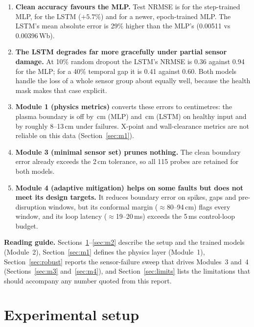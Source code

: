 \documentclass[11pt,a4paper]{article}
\begin{document}
\begin{enumerate}
  \item \textbf{Clean accuracy favours the MLP.} Test NRMSE is \NRMSEmlpold{} for the step-trained MLP, \NRMSElstm{} for the LSTM
        ($+5.7\%$) and \NRMSEmlp{} for a newer, epoch-trained MLP. The LSTM's mean absolute error is 29\% higher than the MLP's
        (0.00511 vs 0.00396\,Wb).
  \item \textbf{The LSTM degrades far more gracefully under partial sensor damage.} At 10\% random dropout the LSTM's NRMSE is
        0.36 against 0.94 for the MLP; for a 40\% temporal gap it is 0.41 against 0.60. Both models handle the loss of a whole
        sensor group about equally well, because the health mask makes that case explicit.
  \item \textbf{Module 1 (physics metrics)} converts these errors to centimetres: the plasma boundary is off by
        \CleanBndMLP\,cm (MLP) and \CleanBndLSTM\,cm (LSTM) on healthy input and by roughly 8--13\,cm under failures.
        X-point and wall-clearance metrics are not reliable on this data (Section~\ref{sec:m1}).
  \item \textbf{Module 3 (minimal sensor set) prunes nothing.} The clean boundary error already exceeds the 2\,cm tolerance, so
        all 115 probes are retained for both models.
  \item \textbf{Module 4 (adaptive mitigation) helps on some faults but does not meet its design targets.} It reduces
        boundary error on spikes, gaps and pre-disruption windows, but its conformal margin ($\approx$80--94\,cm) flags every
        window, and its loop latency ($\approx$19--20\,ms) exceeds the 5\,ms control-loop budget.
\end{enumerate}

\noindent\textbf{Reading guide.} Sections~\ref{sec:setup}--\ref{sec:m2} describe the setup and the trained models (Module~2),
Section~\ref{sec:m1} defines the physics layer (Module~1), Section~\ref{sec:robust} reports the sensor-failure sweep that drives
Modules~3 and~4 (Sections~\ref{sec:m3} and~\ref{sec:m4}), and Section~\ref{sec:limits} lists the limitations that should accompany
any number quoted from this report.

\section{Experimental setup}\label{sec:setup}
\end{document}
